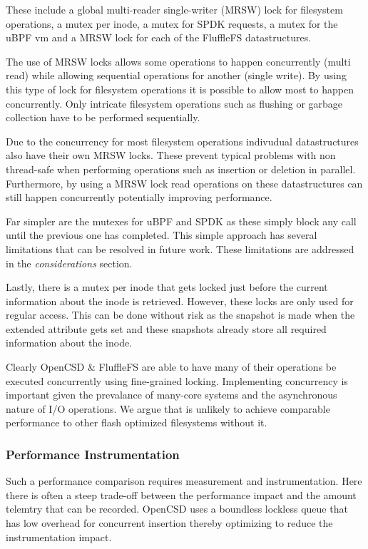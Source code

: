 These include a global multi-reader single-writer (MRSW) lock for filesystem
operations, a mutex per inode, a mutex for SPDK requests, a mutex for the uBPF
vm and a MRSW lock for each of the FluffleFS datastructures.

The use of MRSW locks allows some operations to happen concurrently (multi read)
while allowing sequential operations for another (single write). By using this
type of lock for filesystem operations it is possible to allow most to happen
concurrently. Only intricate filesystem operations such as flushing or garbage
collection have to be performed sequentially.

Due to the concurrency for most filesystem operations indivudual datastructures
also have their own MRSW locks. These prevent typical problems with non
thread-safe when performing operations such as insertion or deletion in
parallel. Furthermore, by using a MRSW lock read operations on these
datastructures can still happen concurrently potentially improving performance.

Far simpler are the mutexes for uBPF and SPDK as these simply block any call
until the previous one has completed. This simple approach has several
limitations that can be resolved in future work. These limitations are addressed
in the \textit{considerations} section.

Lastly, there is a mutex per inode that gets locked just before the current
information about the inode is retrieved. However, these locks are only used for
regular access. This can be done without risk as the snapshot is made when the
extended attribute gets set and these snapshots already store all required
information about the inode.

Clearly OpenCSD \& FluffleFS are able to have many of their operations be executed
concurrently using fine-grained locking. Implementing concurrency is important
given the prevalance of many-core systems and the asynchronous nature of I/O
operations. We argue that is unlikely to achieve comparable performance to other
flash optimized filesystems without it.

\subsubsection{Performance Instrumentation}

Such a performance comparison requires measurement and instrumentation. Here
there is often a steep trade-off between the performance impact and the amount
telemtry that can be recorded. OpenCSD uses a boundless lockless
queue \cite{Michael1996SimpleFA} that has low overhead for concurrent insertion
thereby optimizing to reduce the instrumentation impact.

